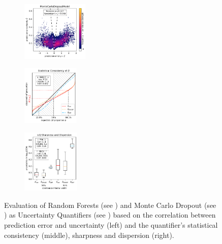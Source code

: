 \begin{figure}[H]
    \begin{subfigure}
    \centering
    \includegraphics[width=0.348\textwidth,valign=t]{uncertainty/figures/uq.montecarlodropoutmodel-correlation.pdf}
    \end{subfigure}
    \begin{subfigure}
    \centering
    \includegraphics[width=0.299\textwidth,valign=t]{uncertainty/figures/uq.montecarlodropoutmodel-consistency.pdf}
    \end{subfigure}
    \begin{subfigure}
    \centering
    \includegraphics[width=0.303\textwidth,valign=t]{uncertainty/figures/uq.montecarlodropoutmodel-sharpness.pdf}
    \end{subfigure}
   
    \vspace{-1em}
    \caption[Evaluation of Random Forests and Monte Carlo Dropout as Uncertainty Quantifiers]{Evaluation of Random Forests (see ) and Monte Carlo Dropout (see ) as Uncertainty Quantifiers (see ) based on the correlation between prediction error and uncertainty (left) and the quantifier's statistical consistency (middle), sharpness and dispersion (right).}
    \label{fig:uncertainty-rf-mc-dropout}
\end{figure}

